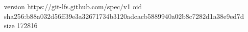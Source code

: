 version https://git-lfs.github.com/spec/v1
oid sha256:b88a032d56ff39e3a32671734b3120adcacb5889940a02b8c7282d1a38e9ed7d
size 172816
